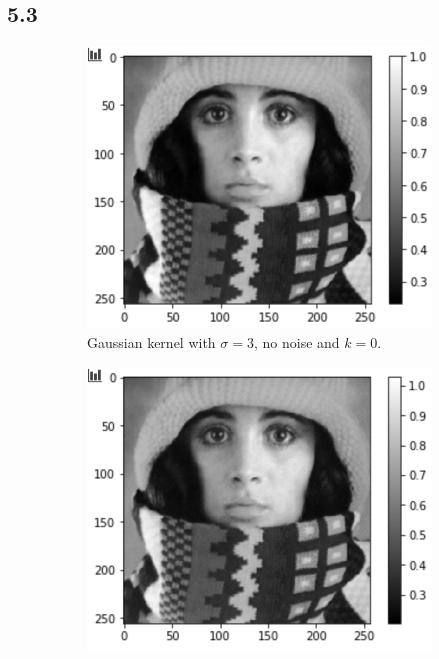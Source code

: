 \subsection*{5.3}
\begin{figure}[H]
	\centering
	\begin{subfigure}[b]{0.45\linewidth}
		\centering
		\includegraphics[width=\linewidth]{Materials/E5/w1}
		\caption{Gaussian kernel with $\sigma = 3$, no noise and $k = 0$.\\\hfill}
	\end{subfigure}
	\hfill
	\begin{subfigure}[b]{0.45\linewidth}
		\centering
		\includegraphics[width=\linewidth]{Materials/E5/w2}

\end{subfigure}
\end{figure}

